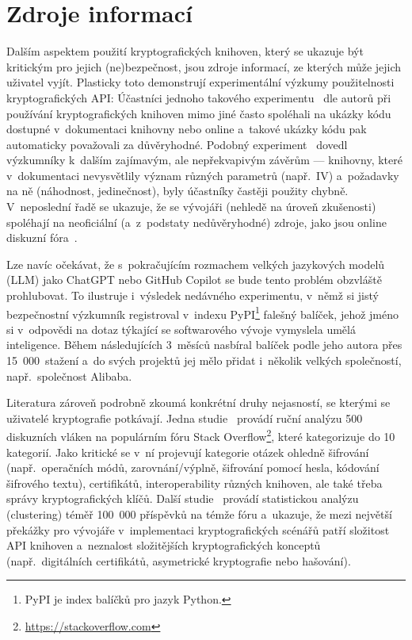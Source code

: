 \section{Zdroje informací}

Dalším aspektem použití kryptografických knihoven, který se ukazuje být kritickým pro jejich (ne)bez\-peč\-nost, jsou zdroje informací, ze kterých může jejich uživatel vyjít. Plasticky toto demonstrují experimentální výzkumy použitelnosti kryptografických API: Účastníci jednoho takového experimentu~\cite{rustcryptoapis} dle autorů při používání kryptografických knihoven mimo jiné často spoléhali na ukázky kódu dostupné v~dokumentaci knihovny nebo online a~takové ukázky kódu pak automaticky považovali za důvěryhodné. Podobný experiment~\cite{comparing2017} dovedl výzkumníky k~dalším zajímavým, ale nepřekvapivým závěrům --- knihovny, které v~dokumentaci nevysvětlily význam různých parametrů (např.~IV) a~požadavky na ně (náhodnost, jedinečnost), byly účastníky častěji použity chybně. V~neposlední řadě se ukazuje, že se vývojáři (nehledě na úroveň zkušenosti) spoléhají na neoficiální (a~z~podstaty nedůvěryhodné) zdroje, jako jsou online diskuzní fóra~\cite{worrisome, rustcryptoapis, hurdles}.

Lze navíc očekávat, že s~pokračujícím rozmachem velkých jazykových modelů (LLM) jako ChatGPT nebo GitHub Copilot se bude tento problém obzvláště prohlubovat. To ilustruje i~výsledek nedávného experimentu, v~němž si jistý bezpečnostní výzkumník registroval v~indexu PyPI\footnote{PyPI je index balíčků pro jazyk Python.} falešný balíček, jehož jméno si v~odpovědi na dotaz týkající se softwarového vývoje vymyslela umělá inteligence. Během následujících 3~měsíců nasbíral balíček podle jeho autora přes 15~000~stažení a~do svých projektů jej mělo přidat i~několik velkých společností, např.\ společnost Alibaba.~\cite{ai-hallucinate}

Literatura zároveň podrobně zkoumá konkrétní druhy nejasností, se kterými se uživatelé kryptografie potkávají. Jedna studie~\cite{dazedandconfused} provádí ruční analýzu 500 diskuzních vláken na populárním fóru Stack Overflow\footnote{\url{https://stackoverflow.com}}, které kategorizuje do 10 kategorií. Jako kritické se v~ní projevují kategorie otázek ohledně šifrování (např.\ operačních módů, zarovnání/výplně, šifrování pomocí hesla, kódování šifrového textu), certifikátů, interoperability různých knihoven, ale také třeba správy kryptografických klíčů. Další studie~\cite{hurdles} provádí statistickou analýzu (clustering) téměř 100~000 příspěvků na témže fóru a~ukazuje, že mezi největší překážky pro vývojáře v~implementaci kryptografických scénářů patří složitost API knihoven a~neznalost složitějších kryptografických konceptů (např.\ digitálních certifikátů, asymetrické kryptografie nebo hašování).

